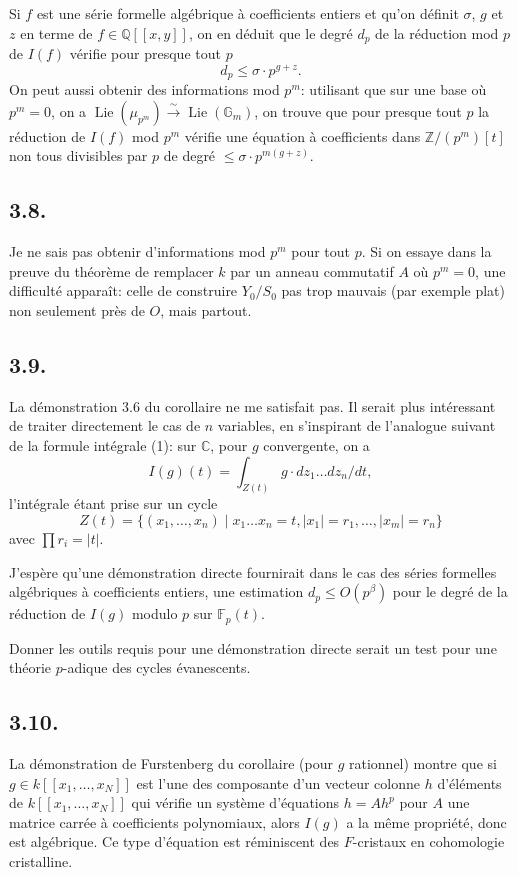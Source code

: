 \documentclass[11pt,leqno]{article}
\DeclareMathOperator{\Lie}{Lie}
\newcommand{\CC}{\mathbb C}
\newcommand{\GG}{\mathbb G}
\newcommand{\FF}{\mathbb F}
\newcommand{\ZZ}{\mathbb Z}
\newcommand{\QQ}{\mathbb Q}
\begin{document}
Si $f$ est une série formelle algébrique à coefficients entiers et qu'on définit $\sigma$, $g$ et $z$ en terme de $f\in\QQ[[x,y]]$, on en déduit que le degré $d_p$ de la réduction mod $p$ de $I(f)$ vérifie pour presque tout $p$
\begin{equation}
        d_p\le\sigma\cdot p^{g+z}. \tag{3.7.2}
\end{equation}
On peut aussi obtenir des informations mod $p^m$: utilisant que sur une base où $p^m=0$, on a $\Lie(\mu_{p^m})\xrightarrow{\sim}\Lie(\GG_m)$, on trouve que pour presque tout $p$ la réduction de $I(f)$ mod $p^m$ vérifie une équation à coefficients dans $\ZZ/(p^m)[t]$ non tous divisibles par $p$ de degré $\le\sigma\cdot p^{m(g+z)}$.

\subsection*{3.8.}
Je ne sais pas obtenir d'informations mod $p^m$ pour tout $p$. Si on essaye dans la preuve du théorème de remplacer $k$ par un anneau commutatif $A$ où $p^m=0$, une difficulté apparaît: celle de construire $Y_0/S_0$ pas trop mauvais (par exemple plat) non seulement près de $O$, mais partout.

\subsection*{3.9.}
La démonstration 3.6 du corollaire ne me satisfait pas. Il serait plus intéressant de traiter directement le cas de $n$ variables, en s'inspirant de l'analogue suivant de la formule intégrale (1): sur $\CC$, pour $g$ convergente, on a
\begin{equation}
        I(g)(t)=\int_{Z(t)} g\cdot dz_1\ldots dz_n/dt, \tag{1'}
\end{equation}
l'intégrale étant prise sur un cycle
\[
        Z(t)=\{(x_1,\ldots,x_n)\mid x_1\ldots x_n=t,
        |x_1|=r_1,\ldots,|x_m|=r_n\}
\]
avec $\prod r_i=|t|$.

J'espère qu'une démonstration directe fournirait dans le cas des séries formelles algébriques à coefficients entiers, une estimation $d_p\le O(p^\beta)$ pour le degré de la réduction de $I(g)$ modulo $p$ sur $\FF_p(t)$.

Donner les outils requis pour une démonstration directe serait un test pour une théorie $p$-adique des cycles évanescents.

\subsection*{3.10.}
La démonstration de Furstenberg du corollaire (pour $g$ rationnel) montre que si $g\in k[[x_1,\ldots,x_N]]$ est l'une des composante d'un vecteur colonne $h$
\clearpage
d'éléments de $k[[x_1,\ldots,x_N]]$ qui vérifie un système d'équations $h=Ah^p$ pour $A$ une matrice carrée à coefficients polynomiaux, alors $I(g)$ a la même propriété, donc est algébrique. Ce type d'équation est réminiscent des $F$-cristaux en cohomologie cristalline.
\end{document}
